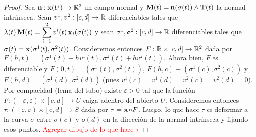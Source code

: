 \begin{prop}
\begin{proof}
Sea $\operatorname{\mathbf{n}}:\operatorname{\mathbf{x}}(U)\to\mathbb{R}^3$ un campo normal y $\operatorname{\mathbf{M}}(t)=\operatorname{\mathbf{n}}(\sigma(t))\wedge\operatorname{\mathbf{T}}(t)$ la normal intrínseca. Sean $v^1,v^2:[c,d]\to\mathbb{R}$ diferenciables tales que $\lambda(t)\operatorname{\mathbf{M}}(t)=\displaystyle\sum_{i=1}^2 v^i(t)\operatorname{\mathbf{x}}_i(\sigma(t))$ y sean $\sigma^1,\sigma^2:[c,d]\to\mathbb{R}$ diferenciables tales que $\sigma(t)=\operatorname{\mathbf{x}}(\sigma^1(t),\sigma^2(t))$. Consideremos entonces $F:\mathbb{R}\times [c,d]\to\mathbb{R}^2$ dada por $F(h,t)=(\sigma^1(t)+hv^1(t),\sigma^2(t)+hv^2(t))$. Ahora bien, $F$ es diferenciable y $F(0,t)=(\sigma^1(t),\sigma^2(t))$, $F(h,c)\equiv (\sigma^1(c),\sigma^2(c))$ y $F(h,d)=(\sigma^1(d),\sigma^2(d))$ (pues $v^1(c)=v^1(d)=v^2(c)=v^2(d)=0$). Por compacidad (lema del tubo) existe $\varepsilon>0$ tal que la función $F:(-\varepsilon,\varepsilon)\times [c,d]\to U$ caiga adentro del abierto $U$. Consideremos entonces $\tau:(-\varepsilon,\varepsilon)\times [c,d]\to S$ dada por $\tau = \operatorname{\mathbf{x}}\circ F$. Luego, lo que hace $\tau$ es deformar a la curva $\sigma$ entre $\sigma(c)$ y $\sigma(d)$ en la dirección de la normal intrínseca y fijando esos puntos. \textcolor{red}{Agregar dibujo de lo que hace $\tau$}


\end{proof}
\end{prop}
